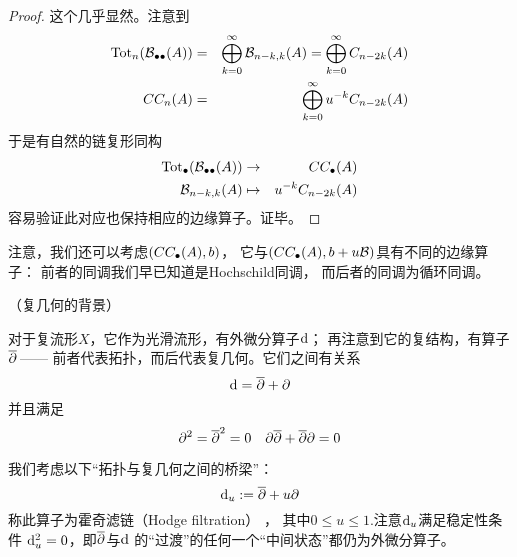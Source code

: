 \begin{proof}
这个几乎显然。注意到
\begin{eqnarray*}
  \operatorname{Tot}_n(\mathcal{B}_{\bullet\bullet}(A))&=&
  \bigoplus_{k=0}^{\infty}
    \mathcal{B}_{n-k,k}(A)
=
  \bigoplus_{k=0}^{\infty}
    C_{n-2k}(A)
\\
  CC_n(A)&=&
  \bigoplus_{k=0}^{\infty}
    u^{-k}C_{n-2k}(A)
\end{eqnarray*}
于是有自然的链复形同构
\begin{eqnarray*}
  \operatorname{Tot}_{\bullet}(\mathcal{B}_{\bullet\bullet}(A))&\to& CC_{\bullet}(A)\\
  \mathcal{B}_{n-k,k}(A)&\mapsto& u^{-k}C_{n-2k}(A)
\end{eqnarray*}
容易验证此对应也保持相应的边缘算子。证毕。
\end{proof}

注意，我们还可以考虑$(CC_{\bullet}(A),b)$，
它与$(CC_{\bullet}(A),b+u\mathcal{B})$具有不同的边缘算子：
前者的同调我们早已知道是Hochschild同调，
而后者的同调为循环同调。

\begin{rem}（复几何的背景）






对于复流形$X$，它作为光滑流形，有外微分算子$\mathrm{d}$；
再注意到它的复结构，有算子$\overline{\partial}\,$——
前者代表拓扑，而后代表复几何。它们之间有关系
$$\mathrm{d}=\overline{\partial}+\partial$$
并且满足
$$\partial^2=\overline{\partial}^2=0\quad\partial\overline{\partial}+\overline{\partial}\partial=0$$

我们考虑以下“拓扑与复几何之间的桥梁”：
$$\mathrm{d}_u:=\overline{\partial}+u\partial$$
称此算子为霍奇滤链（Hodge filtration）
，
其中$0\leq u\leq 1$.注意$\mathrm{d}_u$满足稳定性条件
$\mathrm{d}_u^2=0$，即$\overline{\partial}$与$\mathrm{d}$
的“过渡”的任何一个“中间状态”都仍为外微分算子。
\end{rem}

